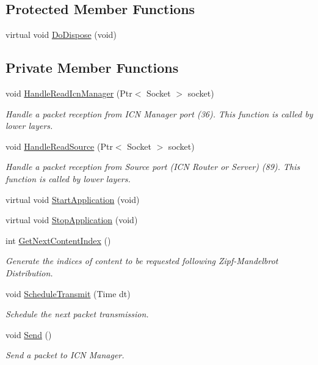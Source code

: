 \subsection*{Protected Member Functions}
\begin{DoxyCompactItemize}
\item 
virtual void \hyperlink{classns3_1_1OICNZipfClient_aa0e32df291032ec158f3bdad7022d7b4}{Do\-Dispose} (void)
\end{DoxyCompactItemize}
\subsection*{Private Member Functions}
\begin{DoxyCompactItemize}
\item 
void \hyperlink{classns3_1_1OICNZipfClient_a82eace7ea478582445022df4add70a9c}{Handle\-Read\-Icn\-Manager} (Ptr$<$ Socket $>$ socket)
\begin{DoxyCompactList}\small\item\em Handle a packet reception from I\-C\-N Manager port (36). This function is called by lower layers. \end{DoxyCompactList}\item 
void \hyperlink{classns3_1_1OICNZipfClient_aee5aa32b3b7d847ac8f01db8439a2b33}{Handle\-Read\-Source} (Ptr$<$ Socket $>$ socket)
\begin{DoxyCompactList}\small\item\em Handle a packet reception from Source port (I\-C\-N Router or Server) (89). This function is called by lower layers. \end{DoxyCompactList}\item 
virtual void \hyperlink{classns3_1_1OICNZipfClient_abe66add9def5db29de9e2fc4b274c636}{Start\-Application} (void)
\item 
virtual void \hyperlink{classns3_1_1OICNZipfClient_af6857512948b5fbcf711f7a126133473}{Stop\-Application} (void)
\item 
int \hyperlink{classns3_1_1OICNZipfClient_a55dcd262453681f5b464cdf732d68ed2}{Get\-Next\-Content\-Index} ()
\begin{DoxyCompactList}\small\item\em Generate the indices of content to be requested following Zipf-\/\-Mandelbrot Distribution. \end{DoxyCompactList}\item 
void \hyperlink{classns3_1_1OICNZipfClient_aa7c04e11ce1f197bd4462e961ef04a2e}{Schedule\-Transmit} (Time dt)
\begin{DoxyCompactList}\small\item\em Schedule the next packet transmission. \end{DoxyCompactList}\item 
void \hyperlink{classns3_1_1OICNZipfClient_a3c656a3d51f7ddc8d6b31fbb88f2a575}{Send} ()
\begin{DoxyCompactList}\small\item\em Send a packet to I\-C\-N Manager. \end{DoxyCompactList}\end{DoxyCompactItemize}
